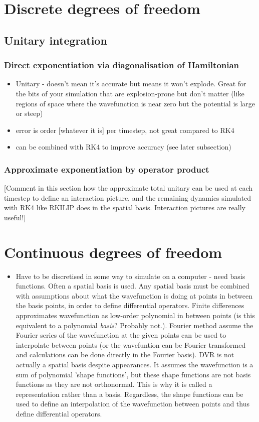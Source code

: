 \section{Discrete degrees of freedom}
    \subsection{Unitary integration}
        \subsubsection{Direct exponentiation via diagonalisation of Hamiltonian}
        \begin{itemize}
        \item Unitary - doesn't mean it's accurate but means it won't explode. Great for the bits of your simulation that are explosion-prone but don't matter (like regions of space where the wavefunction is near zero but the potential is large or steep)
        \item error is order [whatever it is] per timestep, not great compared to RK4
        \item can be combined with RK4 to improve accuracy (see later subsection)
        \end{itemize}
        \subsubsection{Approximate exponentiation by operator product}

        [Comment in this section how the approximate total unitary can be used at each timestep to define an interaction picture, and the remaining dynamics simulated with RK4 like RKILIP does in the spatial basis. Interaction pictures are really useful!]
\section{Continuous degrees of freedom}
    \begin{itemize}
        \item Have to be discretised in some way to simulate on a computer - need basis functions. Often a spatial basis is used. Any spatial basis must be combined with assumptions about what the wavefunction is doing at points in between the basis points, in order to define differential operators. Finite differences approximates wavefunction as low-order polynomial in between points (is this equivalent to a polynomial \emph{basis}? Probably not.). Fourier method assume the Fourier series of the wavefunction at the given points can be used to interpolate between points (or the wavefuntion can be Fourier transformed and calculations can be done directly in the Fourier basis). DVR is not actually a spatial basis despite appearances. It assumes the wavefunction is a sum of polynomial 'shape functions', but these shape functions are not basis functions as they are not orthonormal. This is why it is called a representation rather than a basis. Regardless, the shape functions can be used to define an interpolation of the wavefunction between points and thus define differential operators.

    \end{itemize}
